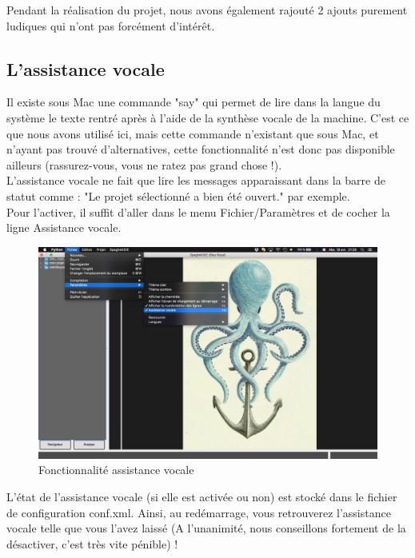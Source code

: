 \documentclass[a4paper,12pt]{article}
\begin{document}
	Pendant la réalisation du projet, nous avons également rajouté 2 ajouts purement ludiques qui n'ont pas forcément d'intérêt. 
	
	\subsection{L'assistance vocale}
	
		Il existe sous Mac une commande "say" qui permet de lire dans la langue du système le texte rentré après à l'aide de la synthèse vocale de la machine. C'est ce que nous avons utilisé ici, mais cette commande n'existant que sous Mac, et n'ayant pas trouvé d'alternatives, cette fonctionnalité n'est donc pas disponible ailleurs (rassurez-vous, vous ne ratez pas grand chose !).\\
		
		L'assistance vocale ne fait que lire les messages apparaissant dans la barre de statut comme : "Le projet sélectionné a bien été ouvert." par exemple.\\
		
		Pour l'activer, il suffit d'aller dans le menu Fichier/Paramètres et de cocher la ligne Assistance vocale.
		
		\begin{figure}[h!]
			\begin{center}
					\includegraphics[scale=0.15]{images/assist_voc}
					\caption{Fonctionnalité assistance vocale}
			\end{center}
	\end{figure}
	
	L'état de l'assistance vocale (si elle est activée ou non) est stocké dans le fichier de configuration conf.xml. Ainsi, au redémarrage, vous retrouverez l'assistance vocale telle que vous l'avez laissé (A l'unanimité, nous conseillons fortement de la désactiver, c'est très vite pénible) !\\
	
\end{document}
